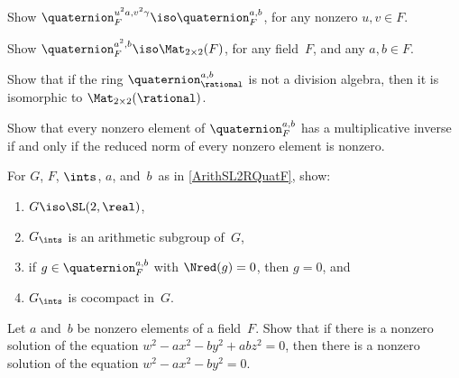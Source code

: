 \begin{exercises}

\item \label{Db2=D}
 Show $\quaternion^{u^2a,v^2\gamma}_F \iso
\quaternion^{a,b}_F$, for any nonzero $u,v \in F$.

\item \label{Quat1=Mat}
 Show $\quaternion^{a^2,b}_F \iso \Mat_{2 \times 2}(F)$, for any
field~$F$, and any $a,b \in F$.

\item \label{QuatZeroDiv=Mat}
 Show that if the ring $\quaternion^{a,b}_\rational$ is not a division
algebra, then it is isomorphic to $\Mat_{2 \times 2}(\rational)$.
 
\item \label{QuatInverses}
 Show that every nonzero element of $\quaternion^{a,b}_F$ has a
multiplicative inverse if and only if the reduced norm of every nonzero element is nonzero.

\item \label{SL1DCocpctEg}
 For $G$, $F$, $\ints$, $a$, and~$b$~as in
\cref{ArithSL2RQuatF}, show:
 \begin{enumerate}
 \item $G \iso \SL(2,\real)$,
 \item $G_{\ints}$ is an arithmetic subgroup of~$G$,
 \item if $g \in \quaternion^{a,b}_F$ with $\Nred(g) = 0$, then $g =
0$, and
 \item $G_{\ints}$ is cocompact in~$G$.
 \end{enumerate}

\item \label{ZeroDiv(k=0)}
 Let $a$ and~$b$ be nonzero elements of a field~$F$.
Show that if there is a nonzero solution of the equation
$w^2 - a x^2 - b y^2 + a b z^2 = 0$, then there is a
nonzero solution of the equation $w^2 - a x^2 - b y^2 = 0$.


\end{exercises}
